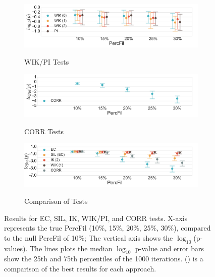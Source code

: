 \documentclass[12pt]{article}
\begin{document}
\begin{center}
\begin{figure}[htp!]
    \begin{subfigure}{.47\textwidth}
      \centering
      \caption{WIK/PI Tests}
      \includegraphics[height = .78in]{figure_8_weighted_contour_group.pdf}
      \label{fig:sub_weight}
    \end{subfigure}
    \begin{subfigure}{.47\textwidth}
      \caption{CORR Tests}
      \includegraphics[height = .78in]{figure_8_correlation_group.pdf}
      \label{fig:sub_corr}
    \end{subfigure}
    \begin{subfigure}{.47\textwidth}
      \caption{Comparison of Tests}
      \includegraphics[height = .78in]{figure_8_best_group}
      \label{fig:sub_best}
    \end{subfigure}
    \caption{Results for EC, SIL, IK, WIK/PI, and CORR tests. X-axis represents the true PercFil (10\%, 15\%, 20\%, 25\%, 30\%), compared to the null PercFil of 10\%; The vertical axis shows the $\log_{10}$(p-values). The lines plots the median $\log_{10}$ p-value and error bars show the 25th and 75th percentiles of the 1000 iterations.  () is a comparison of the best results for each approach.
    }
    \label{fig:subLinesUnnormApp}
  \end{figure}
\end{center}
\end{document}

